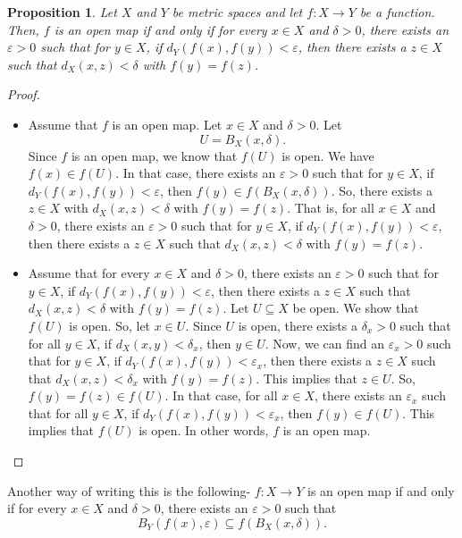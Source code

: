 \documentclass[a4paper, openany]{memoir}
\theoremstyle{definition}
\theoremstyle{plain}
\newtheorem{proposition}[definition]{Proposition}
\begin{document}
    \begin{proposition}
        Let $X$ and $Y$ be metric spaces and let $f: X \to Y$ be a function. Then, $f$ is an open map if and only if for every $x \in X$ and $\delta > 0$, there exists an $\varepsilon > 0$ such that for $y \in X$, if $d_Y(f(x), f(y)) < \varepsilon$, then there exists a $z \in X$ such that $d_X(x, z) < \delta$ with $f(y) = f(z)$.
    \end{proposition}
    \begin{proof}
        \hspace*{0pt}
        \begin{itemize}
            \item Assume that $f$ is an open map. Let $x \in X$ and $\delta > 0$. Let
            \[U = B_X(x, \delta).\]
            Since $f$ is an open map, we know that $f(U)$ is open. We have $f(x) \in f(U)$. In that case, there exists an $\varepsilon > 0$ such that for $y \in X$, if $d_Y(f(x), f(y)) < \varepsilon$, then $f(y) \in f(B_X(x, \delta))$. So, there exists a $z \in X$ with $d_X(x, z) < \delta$ with $f(y) = f(z)$. That is, for all $x \in X$ and $\delta > 0$, there exists an $\varepsilon > 0$ such that for $y \in X$, if $d_Y(f(x), f(y)) < \varepsilon$, then there exists a $z \in X$ such that $d_X(x, z) < \delta$ with $f(y) = f(z)$.
            
            \item Assume that for every $x \in X$ and $\delta > 0$, there exists an $\varepsilon > 0$ such that for $y \in X$, if $d_Y(f(x), f(y)) < \varepsilon$, then there exists a $z \in X$ such that $d_X(x, z) < \delta$ with $f(y) = f(z)$. Let $U \subseteq X$ be open. We show that $f(U)$ is open. So, let $x \in U$. Since $U$ is open, there exists a $\delta_x > 0$ such that for all $y \in X$, if $d_X(x, y) < \delta_x$, then $y \in U$. Now, we can find an $\varepsilon_x > 0$ such that for $y \in X$, if $d_Y(f(x), f(y)) < \varepsilon_x$, then there exists a $z \in X$ such that $d_X(x, z) < \delta_x$ with $f(y) = f(z)$. This implies that $z \in U$. So, $f(y) = f(z) \in f(U)$. In that case, for all $x \in X$, there exists an $\varepsilon_x$ such that for all $y \in X$, if $d_Y(f(x), f(y)) < \varepsilon_x$, then $f(y) \in f(U)$. This implies that $f(U)$ is open. In other words, $f$ is an open map.
        \end{itemize}
    \end{proof}
    \noindent Another way of writing this is the following- $f: X \to Y$ is an open map if and only if for every $x \in X$ and $\delta > 0$, there exists an $\varepsilon > 0$ such that
    \[B_Y(f(x), \varepsilon) \subseteq f(B_X(x, \delta)).\]
\end{document}
